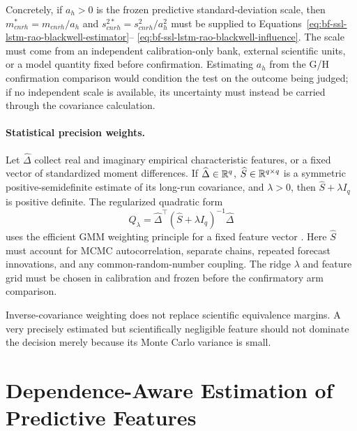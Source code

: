 Concretely, if $a_h>0$ is the frozen predictive standard-deviation scale, then
$m^*_{cnrh}=m_{cnrh}/a_h$ and
$s^{2*}_{cnrh}=s^2_{cnrh}/a_h^2$ must be supplied to
Equations~\eqref{eq:bf-ssl-lstm-rao-blackwell-estimator}--
\eqref{eq:bf-ssl-lstm-rao-blackwell-influence}.  The scale must come from an
independent calibration-only bank, external scientific units, or a model
quantity fixed before confirmation.  Estimating $a_h$ from the G/H
confirmation comparison would condition the test on the outcome being judged;
if no independent scale is available, its uncertainty must instead be carried
through the covariance calculation.

\paragraph{Statistical precision weights.}
Let $\widehat\Delta$ collect real and imaginary empirical characteristic
features, or a fixed vector of standardized moment differences.  If
$\widehat\Delta\in\mathbb{R}^q$, $\widehat S\in\mathbb{R}^{q\times q}$ is a symmetric
positive-semidefinite estimate of its long-run covariance, and $\lambda>0$,
then $\widehat S+\lambda I_q$ is positive definite.  The regularized quadratic
form
\begin{equation}
  Q_\lambda
  =\widehat\Delta^\top
    (\widehat S+\lambda I_q)^{-1}\widehat\Delta
  \label{eq:bf-ssl-lstm-gmm-weight}
\end{equation}
uses the efficient GMM weighting principle for a fixed feature vector
\citep{hansen1982gmm}.  Here $\widehat S$ must account for MCMC
autocorrelation, separate chains, repeated forecast innovations, and any
common-random-number coupling.  The ridge $\lambda$ and feature grid must be
chosen in calibration and frozen before the confirmatory arm comparison.

Inverse-covariance weighting does not replace scientific equivalence margins.
A very precisely estimated but scientifically negligible feature should not
dominate the decision merely because its Monte Carlo variance is small.

\section{Dependence-Aware Estimation of Predictive Features}
\label{sec:bf-ssl-lstm-dependence-aware-features}

